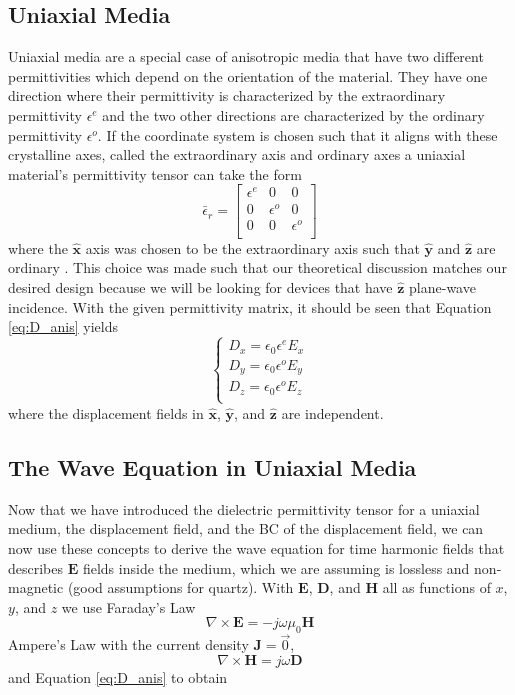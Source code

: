\documentclass{optica-article}
\newcommand{\bv}[1]{\mathbf{#1}}
\begin{document}
\subsection{Uniaxial Media}
Uniaxial media are a special case of anisotropic media that have two different
permittivities which depend on the orientation of the material. They have one
direction where their permittivity is characterized by the extraordinary 
permittivity $\epsilon^e$ and the two other directions are characterized by the 
ordinary permittivity $\epsilon^o$. If the coordinate system is chosen such that
it aligns with these crystalline axes, called the extraordinary axis and 
ordinary axes a uniaxial material's permittivity tensor can take the form
\begin{equation}\label{eq:PT_UA}
  \bar{\epsilon}_r = \begin{bmatrix}
      \epsilon^e & 0 & 0\\
      0 & \epsilon^o & 0\\
     0 & 0 & \epsilon^o\\
  \end{bmatrix}
\end{equation}
where the $\bv{\hat{x}}$ axis was chosen to be the extraordinary axis such that
$\bv{\hat{y}}$ and $\bv{\hat{z}}$ are ordinary \cite{Wav_anis}. This choice was
made such that our theoretical discussion matches our desired design because
we will be looking for devices that have $\bv{\hat{z}}$ plane-wave incidence.
With the given permittivity matrix, it should be seen that Equation 
\eqref{eq:D_anis} yields
\begin{equation}
  \begin{cases}
    D_x = \epsilon_0\epsilon^e E_x\\
    D_y = \epsilon_0\epsilon^o E_y\\
    D_z = \epsilon_0\epsilon^o E_z\\
  \end{cases}
\end{equation}
where the displacement fields in $\bv{\hat{x}}$, $\bv{\hat{y}}$, and 
$\bv{\hat{z}}$ are independent.

\subsection{The Wave Equation in Uniaxial Media}
Now that we have introduced the dielectric permittivity tensor for a
uniaxial medium, the displacement field, and the BC of the displacement
field, we can now use these concepts to derive the wave equation for
time harmonic fields that describes
$\bv{E}$ fields inside the medium, which we are assuming is lossless and 
non-magnetic (good assumptions for quartz).
With $\bv{E}$, $\bv{D}$, and $\bv{H}$ all as functions of $x$, $y$, and $z$
we use Faraday's Law
\begin{equation}
  \nabla\times \bv{E} = -j\omega \mu_0\bv{H}
\end{equation}
Ampere's Law with the current density $\bv{J}=\vec{0}$,
\begin{equation}
  \nabla\times \bv{H} = j\omega\bv{D}
\end{equation}
and Equation \eqref{eq:D_anis} to obtain
 
\end{document}
